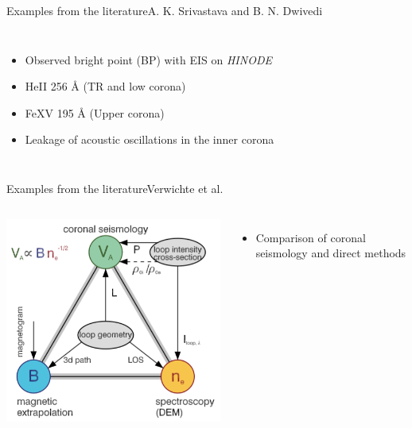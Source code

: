 \documentclass[table]{beamer}
\begin{document}
\begin{frame}{Examples from the literature}{A. K. Srivastava and B. N. Dwivedi}
\begin{columns}
\begin{itemize}
            \item Observed bright point (BP) with EIS on \emph{HINODE}
            \item He{\footnotesize II} 256 \AA{} (TR and low corona)
            \item Fe{\footnotesize XV} 195 \AA{} (Upper corona)
            \item Leakage of acoustic oscillations in the inner corona
        \end{itemize}
    \end{columns}
\end{frame}%
\begin{frame}{Examples from the literature}{Verwichte et al.}
    \begin{columns}
        \includegraphics[width=\textwidth]{tor2.png}
        \begin{itemize}
            \item Comparison of coronal seismology and direct methods
        \end{itemize}
    \end{columns}
\end{frame}%
\end{document}
